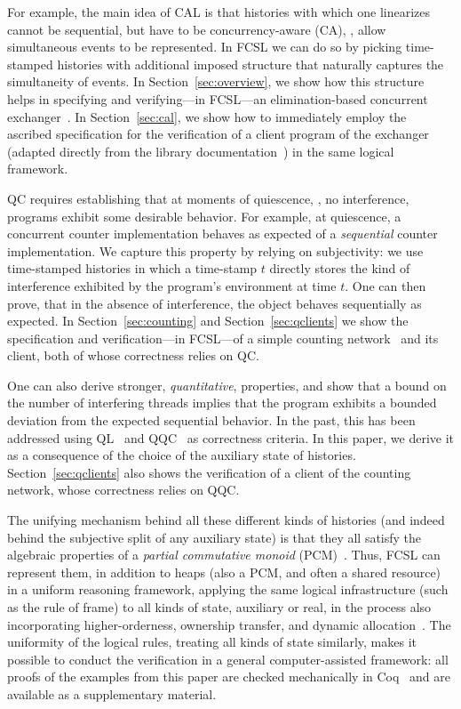 For example, the main idea of CAL is that histories with which one
linearizes cannot be sequential, but have to be concurrency-aware
(CA), \ie, allow simultaneous events to be represented. In FCSL we can
do so by picking time-stamped histories with additional imposed
structure that naturally captures the simultaneity of events. In
Section~\ref{sec:overview}, we show how this structure helps in
specifying and verifying---in FCSL---an elimination-based concurrent
exchanger~\cite{Scherer-al:SCOOL05}. In Section~\ref{sec:cal}, we show
how to immediately employ the ascribed specification for the
verification of a client program of the exchanger (adapted directly
from the  library
documentation~\cite{ExchangerClass}) in the same logical framework.


QC requires establishing that at moments of quiescence, \ie, no
interference, programs exhibit some desirable behavior. For example,
at quiescence, a concurrent counter implementation behaves as expected
of a \emph{sequential} counter implementation. We capture this
property by relying on subjectivity: we use time-stamped histories in
which a time-stamp $t$ directly stores the kind of interference
exhibited by the program's environment at time $t$.  One can then
prove, that in the absence of interference, the object behaves
sequentially as expected. In Section~\ref{sec:counting} and
Section~\ref{sec:qclients} we show the specification and
verification---in FCSL---of a simple counting
network~\cite{Aspnes-al:JACM94} and its client, both of whose
correctness relies on QC.

One can also derive stronger, \emph{quantitative}, properties, and
show that a bound on the number of interfering threads implies that
the program exhibits a bounded deviation from the expected sequential
behavior. In the past, this has been addressed using
QL~\cite{Afek-al:OPODIS10} and QQC~\cite{Jagadeesan-Riely:ICALP14} as
correctness criteria. In this paper, we derive it as a consequence of
the choice of the auxiliary state of
histories. Section~\ref{sec:qclients} also shows the verification of a
client of the counting network, whose correctness relies on QQC.

The unifying mechanism behind all these different kinds of histories
(and indeed behind the subjective split of any auxiliary state) is
that they all satisfy the algebraic properties of a \emph{partial
  commutative monoid} (PCM)~\cite{LeyWild-Nanevski:POPL13}. 
%
Thus, FCSL can represent them, in addition to heaps (also a PCM, and
often a shared resource) in a uniform reasoning framework, applying
the same logical infrastructure (such as the rule of frame) to all
kinds of state, auxiliary or real, in the process also incorporating
higher-orderness, ownership transfer, and dynamic
allocation~\cite{Nanevski-al:ESOP14,Sergey-al:ESOP15}.
%
The uniformity of the logical rules, treating all kinds of state
similarly, makes it possible to conduct the verification in a general
computer-assisted framework: all proofs of the examples from this
paper are checked mechanically in Coq~\cite{Coq-manual} and are
available as a supplementary material.

